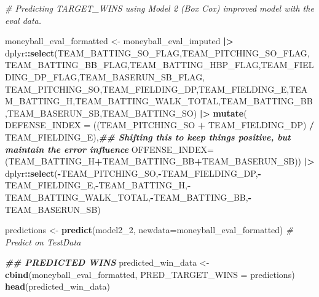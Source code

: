 \documentclass[
]{article}
\newenvironment{Shaded}{\begin{snugshade}}{\end{snugshade}}
\newcommand{\AttributeTok}[1]{\textcolor[rgb]{0.13,0.29,0.53}{#1}}
\newcommand{\CommentTok}[1]{\textcolor[rgb]{0.56,0.35,0.01}{\textit{#1}}}
\newcommand{\DocumentationTok}[1]{\textcolor[rgb]{0.56,0.35,0.01}{\textbf{\textit{#1}}}}
\newcommand{\FunctionTok}[1]{\textcolor[rgb]{0.13,0.29,0.53}{\textbf{#1}}}
\newcommand{\NormalTok}[1]{#1}
\newcommand{\OtherTok}[1]{\textcolor[rgb]{0.56,0.35,0.01}{#1}}
\newcommand{\SpecialCharTok}[1]{\textcolor[rgb]{0.81,0.36,0.00}{\textbf{#1}}}
\begin{document}
\begin{Shaded}
\begin{Highlighting}[]
\CommentTok{\# Predicting TARGET\_WINS using Model 2 (Box Cox) improved model with the eval data. }

\NormalTok{moneyball\_eval\_formatted }\OtherTok{\textless{}{-}}\NormalTok{ moneyball\_eval\_imputed }\SpecialCharTok{|\textgreater{}} 
\NormalTok{  dplyr}\SpecialCharTok{::}\FunctionTok{select}\NormalTok{(TEAM\_BATTING\_SO\_FLAG,TEAM\_PITCHING\_SO\_FLAG,TEAM\_BATTING\_BB\_FLAG,TEAM\_BATTING\_HBP\_FLAG,TEAM\_FIELDING\_DP\_FLAG,TEAM\_BASERUN\_SB\_FLAG,}
\NormalTok{         TEAM\_PITCHING\_SO,TEAM\_FIELDING\_DP,TEAM\_FIELDING\_E,TEAM\_BATTING\_H,TEAM\_BATTING\_WALK\_TOTAL,TEAM\_BATTING\_BB,TEAM\_BASERUN\_SB,TEAM\_BATTING\_SO) }\SpecialCharTok{|\textgreater{}}
  \FunctionTok{mutate}\NormalTok{( }\AttributeTok{DEFENSE\_INDEX =}\NormalTok{ ((TEAM\_PITCHING\_SO }\SpecialCharTok{+}\NormalTok{ TEAM\_FIELDING\_DP) }\SpecialCharTok{/}\NormalTok{ TEAM\_FIELDING\_E),}\DocumentationTok{\#\# Shifting this to keep things positive, but maintain the error influence}
         \AttributeTok{OFFENSE\_INDEX=}\NormalTok{(TEAM\_BATTING\_H}\SpecialCharTok{+}\NormalTok{TEAM\_BATTING\_BB}\SpecialCharTok{+}\NormalTok{TEAM\_BASERUN\_SB)) }\SpecialCharTok{|\textgreater{}}
\NormalTok{  dplyr}\SpecialCharTok{::}\FunctionTok{select}\NormalTok{(}\SpecialCharTok{{-}}\NormalTok{TEAM\_PITCHING\_SO,}\SpecialCharTok{{-}}\NormalTok{TEAM\_FIELDING\_DP,}\SpecialCharTok{{-}}\NormalTok{TEAM\_FIELDING\_E,}\SpecialCharTok{{-}}\NormalTok{TEAM\_BATTING\_H,}\SpecialCharTok{{-}}\NormalTok{TEAM\_BATTING\_WALK\_TOTAL,}\SpecialCharTok{{-}}\NormalTok{TEAM\_BATTING\_BB,}\SpecialCharTok{{-}}\NormalTok{TEAM\_BASERUN\_SB)}


\NormalTok{predictions }\OtherTok{\textless{}{-}} \FunctionTok{predict}\NormalTok{(model2\_2, }\AttributeTok{newdata=}\NormalTok{moneyball\_eval\_formatted)  }\CommentTok{\# Predict on TestData}

\DocumentationTok{\#\# PREDICTED WINS}
\NormalTok{predicted\_win\_data }\OtherTok{\textless{}{-}} \FunctionTok{cbind}\NormalTok{(moneyball\_eval\_formatted, }\AttributeTok{PRED\_TARGET\_WINS =}\NormalTok{ predictions)}
\FunctionTok{head}\NormalTok{(predicted\_win\_data)}
\end{Highlighting}
\end{Shaded}
\end{document}
